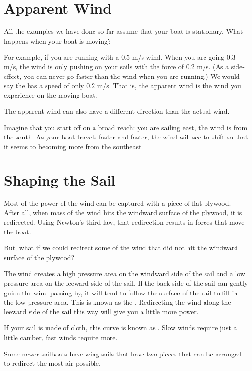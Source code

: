 \section{Apparent Wind}

All the examples we have done so far assume that your boat is stationary.   What happens when your boat is moving?

For example,  if you are running with a 0.5 m/s wind.  When you are going 0.3 m/s,  the wind is only pushing on your sails with the force of 0.2 m/s.  
(As a side-effect, you can never go faster than the wind when you are running.)  We would say the  has a speed of only 0.2 m/s.  
That is, the apparent wind is the wind you experience on the moving boat.

The apparent wind can also have a different direction than the actual wind.

Imagine that you start off on a broad reach: you are sailing east,  the wind is from the south.  As your boat travels faster and faster,   the wind will see to shift so
that it seems to becoming more from the southeast.  

\section{Shaping the Sail}

Most of the power of the wind can be captured with a piece of flat plywood.  After all,  when mass of the wind hits the windward surface of the  plywood,  it is redirected.  Using Newton's third law,  that redirection results in forces that move the boat.

But, what if we could redirect some of the wind that did not hit the windward surface of the plywood?

The wind creates a high pressure area on the windward side of the sail and a low pressure area on the leeward side of the sail.   If the back side of the
sail can gently guide the wind passing by,  it will tend to follow the surface of the sail to fill in the low pressure area.  This is known as the .  Redirecting the wind along the leeward side of the sail this way will give you a little more power.

If your sail is made of cloth,   this curve is known as .  Slow winds require just a little camber,  fast winds require more.

Some newer sailboats have wing sails that have two pieces that can be arranged to redirect the most air possible.

